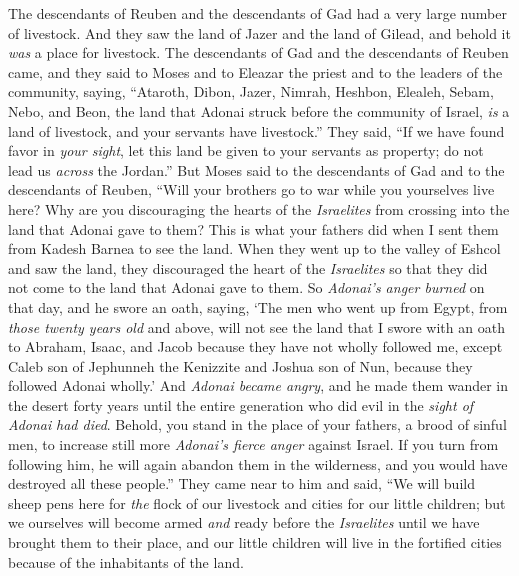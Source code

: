 \begin{biblechapter} %
 The descendants of Reuben and the descendants of Gad had a very large number of livestock. And they saw the land of Jazer and the land of Gilead, and behold it \textit{was} a place for livestock.
\verse The descendants of Gad and the descendants of Reuben came, and they said to Moses and to Eleazar the priest and to the leaders of the community, saying,
\verse “Ataroth, Dibon, Jazer, Nimrah, Heshbon, Elealeh, Sebam, Nebo, and Beon,
\verse the land that Adonai struck before the community of Israel, \textit{is} a land of livestock, and your servants have livestock.”
\verse They said, “If we have found favor in \textit{your sight}, let this land be given to your servants as property; do not lead us \textit{across} the Jordan.”
\verse But Moses said to the descendants of Gad and to the descendants of Reuben, “Will your brothers go to war while you yourselves live here?
\verse Why are you discouraging the hearts of the \textit{Israelites} from crossing into the land that Adonai gave to them?
\verse This is what your fathers did when I sent them from Kadesh Barnea to see the land.
\verse When they went up to the valley of Eshcol and saw the land, they discouraged the heart of the \textit{Israelites} so that they did not come to the land that Adonai gave to them.
\verse So \textit{Adonai’s anger burned} on that day, and he swore an oath, saying,
\verse ‘The men who went up from Egypt, from \textit{those twenty years old} and above, will not see the land that I swore with an oath to Abraham, Isaac, and Jacob because they have not wholly followed me,
\verse except Caleb son of Jephunneh the Kenizzite and Joshua son of Nun, because they followed Adonai wholly.’
\verse And \textit{Adonai became angry}, and he made them wander in the desert forty years until the entire generation who did evil in the \textit{sight of Adonai} \textit{had died}.
\verse Behold, you stand in the place of your fathers, a brood of sinful men, to increase still more \textit{Adonai’s fierce anger} against Israel.
\verse If you turn from following him, he will again abandon them in the wilderness, and you would have destroyed all these people.”
\verse They came near to him and said, “We will build sheep pens here for \textit{the} flock of our livestock and cities for our little children;
\verse but we ourselves will become armed \textit{and} ready before the \textit{Israelites} until we have brought them to their place, and our little children will live in the fortified cities because of the inhabitants of the land.

\end{biblechapter}
